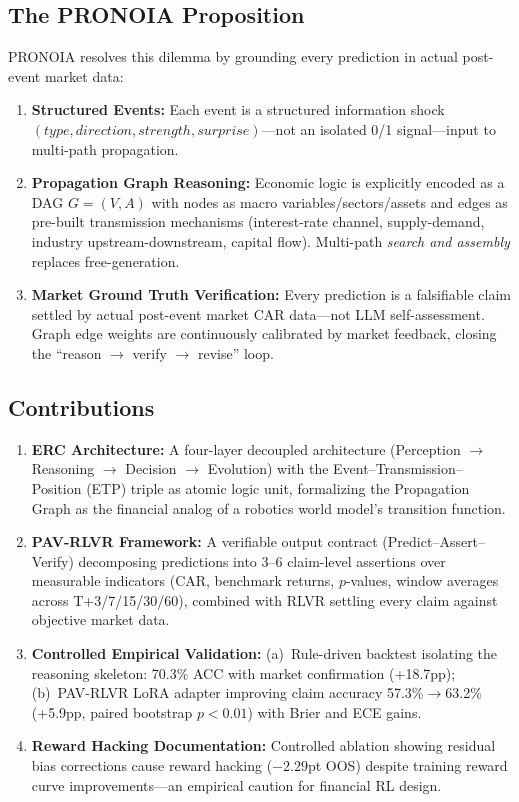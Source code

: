 \documentclass[sigconf, anonymous, review]{acmart}
\begin{document}
\subsection{The PRONOIA Proposition}

PRONOIA resolves this dilemma by grounding every prediction in actual post-event market data:

\begin{enumerate}
    \item \textbf{Structured Events:} Each event is a structured information shock $(type, direction, strength, surprise)$---not an isolated 0/1 signal---input to multi-path propagation.
    \item \textbf{Propagation Graph Reasoning:} Economic logic is explicitly encoded as a DAG $G=(V,A)$ with nodes as macro variables/sectors/assets and edges as pre-built transmission mechanisms (interest-rate channel, supply-demand, industry upstream-downstream, capital flow). Multi-path \emph{search and assembly} replaces free-generation.
    \item \textbf{Market Ground Truth Verification:} Every prediction is a falsifiable claim settled by actual post-event market CAR data---not LLM self-assessment. Graph edge weights are continuously calibrated by market feedback, closing the ``reason $\to$ verify $\to$ revise'' loop.
\end{enumerate}

\subsection{Contributions}

\begin{enumerate}
    \item \textbf{ERC Architecture:} A four-layer decoupled architecture (Perception $\to$ Reasoning $\to$ Decision $\to$ Evolution) with the Event--Transmission--Position (ETP) triple as atomic logic unit, formalizing the Propagation Graph as the financial analog of a robotics world model's transition function.
    \item \textbf{PAV-RLVR Framework:} A verifiable output contract (Predict--Assert--Verify) decomposing predictions into 3--6 claim-level assertions over measurable indicators (CAR, benchmark returns, $p$-values, window averages across T+3/7/15/30/60), combined with RLVR settling every claim against objective market data.
    \item \textbf{Controlled Empirical Validation:} (a)~Rule-driven backtest isolating the reasoning skeleton: 70.3\% ACC with market confirmation (+18.7pp); (b)~PAV-RLVR LoRA adapter improving claim accuracy 57.3\%$\to$63.2\% (+5.9pp, paired bootstrap $p<0.01$) with Brier and ECE gains.
    \item \textbf{Reward Hacking Documentation:} Controlled ablation showing residual bias corrections cause reward hacking ($-2.29$pt OOS) despite training reward curve improvements---an empirical caution for financial RL design.
\end{enumerate}
\end{document}
